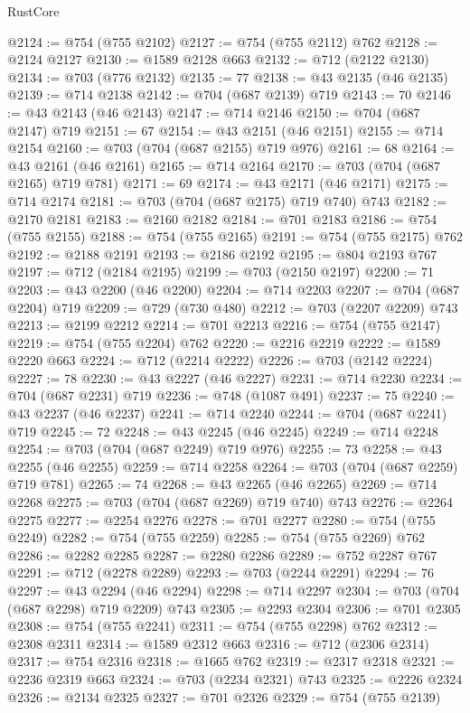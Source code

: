 \begin{lexlean}{RustCore}
\begin{coremodule}
@2124 := @754 (@755 @2102)
@2127 := @754 (@755 @2112) @762
@2128 := @2124 @2127
@2130 := @1589 @2128 @663
@2132 := @712 (@2122 @2130)
@2134 := @703 (@776 @2132)
@2135 := 77
@2138 := @43 @2135 (@46 @2135)
@2139 := @714 @2138
@2142 := @704 (@687 @2139) @719
@2143 := 70
@2146 := @43 @2143 (@46 @2143)
@2147 := @714 @2146
@2150 := @704 (@687 @2147) @719
@2151 := 67
@2154 := @43 @2151 (@46 @2151)
@2155 := @714 @2154
@2160 := @703 (@704 (@687 @2155) @719 @976)
@2161 := 68
@2164 := @43 @2161 (@46 @2161)
@2165 := @714 @2164
@2170 := @703 (@704 (@687 @2165) @719 @781)
@2171 := 69
@2174 := @43 @2171 (@46 @2171)
@2175 := @714 @2174
@2181 := @703 (@704 (@687 @2175) @719 @740) @743
@2182 := @2170 @2181
@2183 := @2160 @2182
@2184 := @701 @2183
@2186 := @754 (@755 @2155)
@2188 := @754 (@755 @2165)
@2191 := @754 (@755 @2175) @762
@2192 := @2188 @2191
@2193 := @2186 @2192
@2195 := @804 @2193 @767
@2197 := @712 (@2184 @2195)
@2199 := @703 (@2150 @2197)
@2200 := 71
@2203 := @43 @2200 (@46 @2200)
@2204 := @714 @2203
@2207 := @704 (@687 @2204) @719
@2209 := @729 (@730 @480)
@2212 := @703 (@2207 @2209) @743
@2213 := @2199 @2212
@2214 := @701 @2213
@2216 := @754 (@755 @2147)
@2219 := @754 (@755 @2204) @762
@2220 := @2216 @2219
@2222 := @1589 @2220 @663
@2224 := @712 (@2214 @2222)
@2226 := @703 (@2142 @2224)
@2227 := 78
@2230 := @43 @2227 (@46 @2227)
@2231 := @714 @2230
@2234 := @704 (@687 @2231) @719
@2236 := @748 (@1087 @491)
@2237 := 75
@2240 := @43 @2237 (@46 @2237)
@2241 := @714 @2240
@2244 := @704 (@687 @2241) @719
@2245 := 72
@2248 := @43 @2245 (@46 @2245)
@2249 := @714 @2248
@2254 := @703 (@704 (@687 @2249) @719 @976)
@2255 := 73
@2258 := @43 @2255 (@46 @2255)
@2259 := @714 @2258
@2264 := @703 (@704 (@687 @2259) @719 @781)
@2265 := 74
@2268 := @43 @2265 (@46 @2265)
@2269 := @714 @2268
@2275 := @703 (@704 (@687 @2269) @719 @740) @743
@2276 := @2264 @2275
@2277 := @2254 @2276
@2278 := @701 @2277
@2280 := @754 (@755 @2249)
@2282 := @754 (@755 @2259)
@2285 := @754 (@755 @2269) @762
@2286 := @2282 @2285
@2287 := @2280 @2286
@2289 := @752 @2287 @767
@2291 := @712 (@2278 @2289)
@2293 := @703 (@2244 @2291)
@2294 := 76
@2297 := @43 @2294 (@46 @2294)
@2298 := @714 @2297
@2304 := @703 (@704 (@687 @2298) @719 @2209) @743
@2305 := @2293 @2304
@2306 := @701 @2305
@2308 := @754 (@755 @2241)
@2311 := @754 (@755 @2298) @762
@2312 := @2308 @2311
@2314 := @1589 @2312 @663
@2316 := @712 (@2306 @2314)
@2317 := @754 @2316
@2318 := @1665 @762
@2319 := @2317 @2318
@2321 := @2236 @2319 @663
@2324 := @703 (@2234 @2321) @743
@2325 := @2226 @2324
@2326 := @2134 @2325
@2327 := @701 @2326
@2329 := @754 (@755 @2139)

\end{coremodule}
\end{lexlean}

